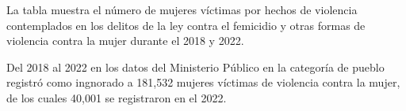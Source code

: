 La tabla muestra el número de mujeres víctimas por hechos de violencia contemplados en los delitos de la ley contra el femicidio y otras formas de violencia contra la mujer durante el 2018 y 2022. 

Del 2018 al 2022 en los datos del Ministerio Público en la categoría de pueblo registró como ingnorado a 181,532 mujeres víctimas de violencia contra la mujer, de los cuales 40,001 se registraron en el 2022. 